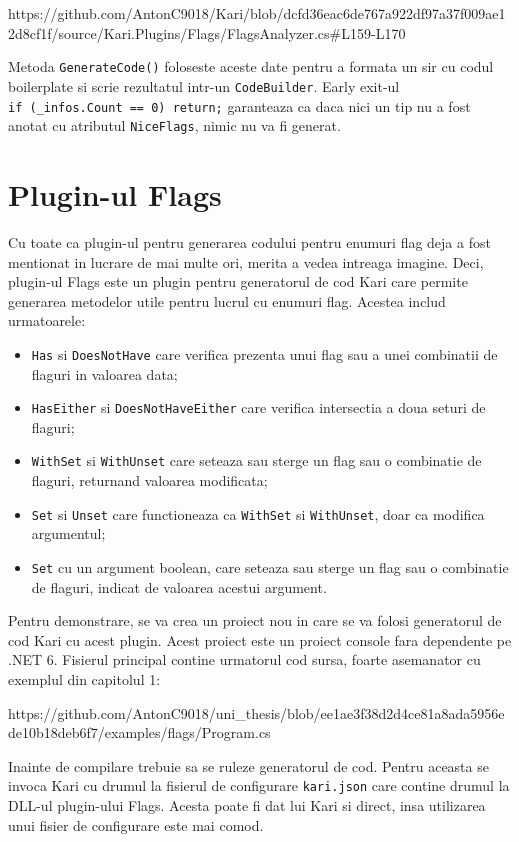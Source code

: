 \documentclass{report}
\begin{document}
https://github.com/AntonC9018/Kari/blob/dcfd36eac6de767a922df97a37f009ae12d8cf1f/source/Kari.Plugins/Flags/FlagsAnalyzer.cs\#L159-L170

Metoda \texttt{GenerateCode()} foloseste aceste date pentru a formata un
sir cu codul boilerplate si scrie rezultatul intr-un
\texttt{CodeBuilder}. Early exit-ul
\texttt{if\ (\_infos.Count\ ==\ 0)\ return;} garanteaza ca daca nici un
tip nu a fost anotat cu atributul \texttt{NiceFlags}, nimic nu va fi
generat.

\section{Plugin-ul Flags}

Cu toate ca plugin-ul pentru generarea codului pentru enumuri flag deja
a fost mentionat in lucrare de mai multe ori, merita a vedea intreaga
imagine. Deci, plugin-ul Flags este un plugin pentru generatorul de cod
Kari care permite generarea metodelor utile pentru lucrul cu enumuri
flag. Acestea includ urmatoarele:

\begin{itemize}
\item
  \texttt{Has} si \texttt{DoesNotHave} care verifica prezenta unui flag
  sau a unei combinatii de flaguri in valoarea data;
\item
  \texttt{HasEither} si \texttt{DoesNotHaveEither} care verifica
  intersectia a doua seturi de flaguri;
\item
  \texttt{WithSet} si \texttt{WithUnset} care seteaza sau sterge un flag
  sau o combinatie de flaguri, returnand valoarea modificata;
\item
  \texttt{Set} si \texttt{Unset} care functioneaza ca \texttt{WithSet}
  si \texttt{WithUnset}, doar ca modifica argumentul;
\item
  \texttt{Set} cu un argument boolean, care seteaza sau sterge un flag
  sau o combinatie de flaguri, indicat de valoarea acestui argument.
\end{itemize}

Pentru demonstrare, se va crea un proiect nou in care se va folosi
generatorul de cod Kari cu acest plugin. Acest proiect este un proiect
console fara dependente pe .NET 6. Fisierul principal contine urmatorul
cod sursa, foarte asemanator cu exemplul din capitolul 1:

https://github.com/AntonC9018/uni\_thesis/blob/ee1ae3f38d2d4ce81a8ada5956ede10b18deb6f7/examples/flags/Program.cs

Inainte de compilare trebuie sa se ruleze generatorul de cod. Pentru
aceasta se invoca Kari cu drumul la fisierul de configurare
\texttt{kari.json} care contine drumul la DLL-ul plugin-ului Flags.
Acesta poate fi dat lui Kari si direct, insa utilizarea unui fisier de
configurare este mai comod.
\end{document}
